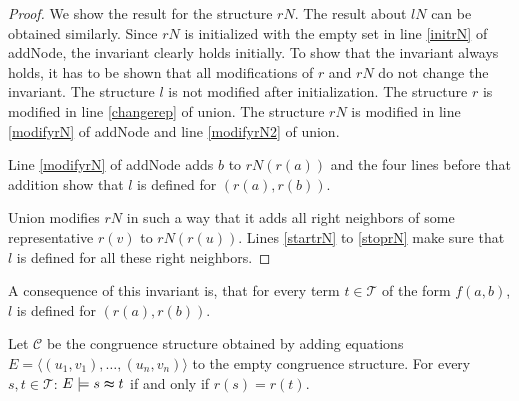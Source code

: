 \begin{proof}

We show the result for the structure $rN$.
The result about $lN$ can be obtained similarly.
Since $rN$ is initialized with the empty set in line \ref{initrN} of addNode, the invariant clearly holds initially.
To show that the invariant always holds, it has to be shown that all modifications of $r$ and $rN$ do not change the invariant.
The structure $l$ is not modified after initialization.
The structure $r$ is modified in line \ref{changerep} of union.
The structure $rN$ is modified in line \ref{modifyrN} of addNode and line \ref{modifyrN2} of union.

Line \ref{modifyrN} of addNode adds $b$ to $rN(r(a))$ and the four lines before that addition show that $l$ is defined for $(r(a),r(b))$.

Union modifies $rN$ in such a way that it adds all right neighbors of some representative $r(v)$ to $rN(r(u))$.
Lines \ref{startrN} to \ref{stoprN} make sure that $l$ is defined for all these right neighbors.

\end{proof}

A consequence of this invariant is, that for every term $t \in \mathcal{T}$ of the form $f(a,b)$, $l$ is defined for $(r(a),r(b))$.

\begin{proposition}

Let $\mathcal{C}$ be the congruence structure obtained by adding equations $E = \langle (u_1,v_1), \ldots, (u_n,v_n) \rangle $ to the empty congruence structure.
For every $s,t \in \mathcal{T}$: $E \models s \thickapprox t$ if and only if $r(s) = r(t)$.

\end{proposition}

